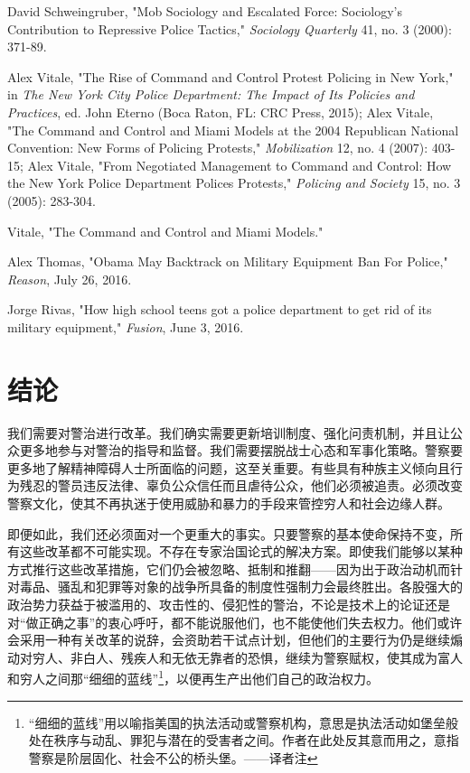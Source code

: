 \documentclass[fontset=fandol, a4paper, 12pt, openright]{ctexbook}
\begin{document}
\begin{enumerate}[label={[\arabic*]}]
    \item David Schweingruber, "Mob Sociology and Escalated Force: Sociology's Contribution to Repressive Police Tactics," \textit{Sociology Quarterly} 41, no. 3 (2000): 371-89.
    \item Alex Vitale, "The Rise of Command and Control Protest Policing in New York," in \textit{The New York City Police Department: The Impact of Its Policies and Practices}, ed. John Eterno (Boca Raton, FL: CRC Press, 2015); Alex Vitale, "The Command and Control and Miami Models at the 2004 Republican National Convention: New Forms of Policing Protests," \textit{Mobilization} 12, no. 4 (2007): 403-15; Alex Vitale, "From Negotiated Management to Command and Control: How the New York Police Department Polices Protests," \textit{Policing and Society} 15, no. 3 (2005): 283-304.
    \item Vitale, "The Command and Control and Miami Models."
    \item Alex Thomas, "Obama May Backtrack on Military Equipment Ban For Police," \textit{Reason}, July 26, 2016.
    \item Jorge Rivas, "How high school teens got a police department to get rid of its military equipment," \textit{Fusion}, June 3, 2016.
\end{enumerate}

\chapter{结论}

我们需要对警治进行改革。我们确实需要更新培训制度、强化问责机制，并且让公众更多地参与对警治的指导和监督。我们需要摆脱战士心态和军事化策略。警察要更多地了解精神障碍人士所面临的问题，这至关重要。有些具有种族主义倾向且行为残忍的警员违反法律、辜负公众信任而且虐待公众，他们必须被追责。必须改变警察文化，使其不再执迷于使用威胁和暴力的手段来管控穷人和社会边缘人群。

即便如此，我们还必须面对一个更重大的事实。只要警察的基本使命保持不变，所有这些改革都不可能实现。不存在专家治国论式的解决方案。即使我们能够以某种方式推行这些改革措施，它们仍会被忽略、抵制和推翻——因为出于政治动机而针对毒品、骚乱和犯罪等对象的战争所具备的制度性强制力会最终胜出。各股强大的政治势力获益于被滥用的、攻击性的、侵犯性的警治，不论是技术上的论证还是对“做正确之事”的衷心呼吁，都不能说服他们，也不能使他们失去权力。他们或许会采用一种有关改革的说辞，会资助若干试点计划，但他们的主要行为仍是继续煽动对穷人、非白人、残疾人和无依无靠者的恐惧，继续为警察赋权，使其成为富人和穷人之间那“细细的蓝线”\footnote{“细细的蓝线”用以喻指美国的执法活动或警察机构，意思是执法活动如堡垒般处在秩序与动乱、罪犯与潜在的受害者之间。作者在此处反其意而用之，意指警察是阶层固化、社会不公的桥头堡。——译者注}，以便再生产出他们自己的政治权力。
\end{document}
